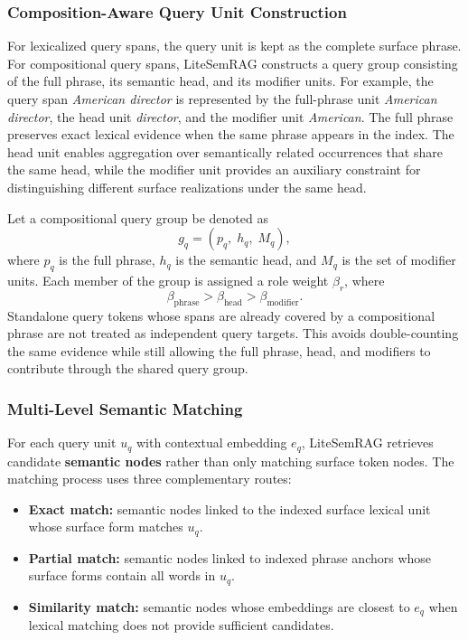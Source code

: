 \documentclass[conference]{IEEEtran}
\begin{document}
\subsubsection{Composition-Aware Query Unit Construction}

For lexicalized query spans, the query unit is kept as the complete surface phrase. For compositional query spans, LiteSemRAG constructs a query group consisting of the full phrase, its semantic head, and its modifier units. For example, the query span \emph{American director} is represented by the full-phrase unit \emph{American director}, the head unit \emph{director}, and the modifier unit \emph{American}. The full phrase preserves exact lexical evidence when the same phrase appears in the index. The head unit enables aggregation over semantically related occurrences that share the same head, while the modifier unit provides an auxiliary constraint for distinguishing different surface realizations under the same head.

Let a compositional query group be denoted as
\[
g_q = (p_q,\; h_q,\; M_q),
\]
where $p_q$ is the full phrase, $h_q$ is the semantic head, and $M_q$ is the set of modifier units. Each member of the group is assigned a role weight $\beta_r$, where
\[
\beta_{\mathrm{phrase}} > \beta_{\mathrm{head}} > \beta_{\mathrm{modifier}}.
\]
Standalone query tokens whose spans are already covered by a compositional phrase are not treated as independent query targets. This avoids double-counting the same evidence while still allowing the full phrase, head, and modifiers to contribute through the shared query group.

\subsubsection{Multi-Level Semantic Matching}

For each query unit $u_q$ with contextual embedding $e_q$, LiteSemRAG retrieves candidate \textbf{semantic nodes} rather than only matching surface token nodes. The matching process uses three complementary routes:

\begin{itemize}
    \item \textbf{Exact match:} semantic nodes linked to the indexed surface lexical unit whose surface form matches $u_q$.

    \item \textbf{Partial match:} semantic nodes linked to indexed phrase anchors whose surface forms contain all words in $u_q$.

    \item \textbf{Similarity match:} semantic nodes whose embeddings are closest to $e_q$ when lexical matching does not provide sufficient candidates.
\end{itemize}
\end{document}
